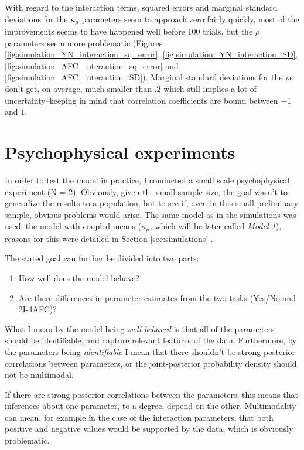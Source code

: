 \documentclass{article}\usepackage{knitr}
\begin{document}
With regard to the interaction terms, squared errors and marginal standard deviations for the $\kappa_{\mu}$ parameters seem to approach zero fairly quickly, most of the improvements seems to have happened well before 100 trials, but the $\rho$ parameters seem more problematic (Figures \ref{fig:simulation_YN_interaction_sq_error}, \ref{fig:simulation_YN_interaction_SD}, \ref{fig:simulation_AFC_interaction_sq_error} and \ref{fig:simulation_AFC_interaction_SD}). Marginal standard deviations for the $\rho$s don't get, on average, much smaller than $.2$ which still implies a lot of uncertainty--keeping in mind that correlation coefficients are bound between $-1$ and $1$.

\newpage


\section{Psychophysical experiments}
\label{sec:pp_exp}

In order to test the model in practice, I conducted a small scale psychophysical experiment (N = 2). Obviously, given the small sample size, the goal wasn't to generalize the results to a population, but to see if, even in this small preliminary sample, obvious problems would arise. The same model as in the simulations was used: the model with coupled means ($\kappa_{\mu}$, which will be later called \textit{Model 1}), reasons for this were detailed in Section \ref{sec:simulations} \textit{}.

The stated goal can further be divided into two parts:

\begin{enumerate}
  \item How well does the model behave? 
  \item Are there differences in parameter estimates from the two tasks (Yes/No and 2I-4AFC)?
\end{enumerate}

What I mean by the model being \textit{well-behaved} is that all of the parameters should be identifiable, and capture relevant features of the data. Furthermore, by the parameters being \textit{identifiable} I mean that there shouldn't be strong posterior correlations between parameters, or the joint-posterior probability density should not be multimodal. 

If there are strong posterior correlations between the parameters, this means that inferences about one parameter, to a degree, depend on the other. Multimodality can mean, for example in the case of the interaction parameters, that both positive and negative values would be supported by the data, which is obviously problematic. 
\end{document}
